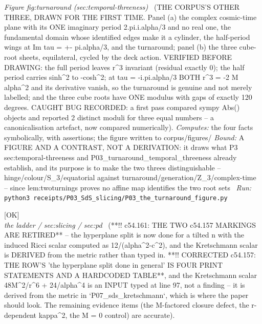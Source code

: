\begin{description}
\textit{Figure fig:turnaround (sec:temporal-threeness)} \ (THE CORPUS'S OTHER THREE, DRAWN FOR THE FIRST TIME. Panel (a) the complex cosmic-time plane with its ONE imaginary period 2.pi.i.alpha/3 and no real one, the fundamental domain whose identified edges make it a cylinder, the half-period wings at Im tau = +- pi.alpha/3, and the turnaround; panel (b) the three cube-root sheets, equilateral, cycled by the deck action. VERIFIED BEFORE DRAWING: the full period leaves r\textasciicircum{}3 invariant (residual exactly 0); the half period carries sinh\textasciicircum{}2 to -cosh\textasciicircum{}2; at tau = -i.pi.alpha/3 BOTH r\textasciicircum{}3 = -2 M alpha\textasciicircum{}2 and its derivative vanish, so the turnaround is genuine and not merely labelled; and the three cube roots have ONE modulus with gaps of exactly 120 degrees. CAUGHT BUG RECORDED: a first pass compared sympy Abs() objects and reported 2 distinct moduli for three equal numbers -- a canonicalisation artefact, now compared numerically). 
\emph{Computes:} the four facts symbolically, with assertions; the figure written to corpus/figures/
 \emph{Bound:} A FIGURE AND A CONTRAST, NOT A DERIVATION: it draws what P3 sec:temporal-threeness and P03\_turnaround\_temporal\_threeness already establish, and its purpose is to make the two threes distinguishable -- hinge/colour/S\_3/equatorial against turnaround/generation/Z\_3/complex-time -- since lem:twoturnings proves no affine map identifies the two root sets
\ \emph{Run:} \texttt{python3 receipts/P03\_SdS\_slicing/P03\_the\_turnaround\_figure.py}
\item[\label{rcpt:P17_the_cut_is_planar_only_at_M_zero}\texttt{P17\_the\_cut\_is\_planar\_only\_at\_M\_zero}]\hfill\textsf{[OK]}\\
\textit{the ladder / sec:slicing / sec:pd} \ (**!! c54.161: THE TWO c54.157 MARKINGS ARE RETIRED** -- the hyperplane split is now done for a tilted n with the induced Ricci scalar computed as 12/(alpha\textasciicircum{}2-c\textasciicircum{}2), and the Kretschmann scalar is DERIVED from the metric rather than typed in. **!! CORRECTED c54.157: THE ROW'S 'the hyperplane split done in general' IS FOUR PRINT STATEMENTS AND A HARDCODED TABLE**, and the Kretschmann scalar 48M\textasciicircum{}2/r\textasciicircum{}6 + 24/alpha\textasciicircum{}4 is an INPUT typed at line 97, not a finding -- it is derived from the metric in `P07\_sds\_kretschmann`, which is where the paper should look. The remaining evidence items (the M-factored closure defect, the r-dependent kappa\textasciicircum{}2, the M = 0 control) are accurate). 

\end{description}
